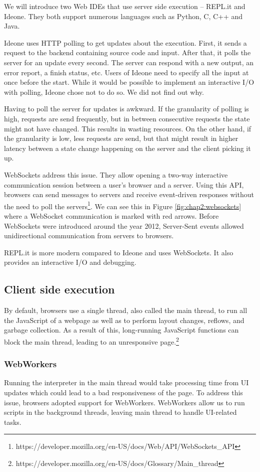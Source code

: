 We will introduce two Web IDEs that use server side execution -- REPL.it and Ideone. They both support numerous languages such
as Python, C, C++ and Java.

Ideone uses HTTP polling to get updates about the execution. First, it sends a request to the backend containing source code and input.
After that, it polls the server for an update every second. The server can respond with a new output, an error report, a finish status, etc. Users of Ideone need to
specify all the input at once before the start. While it would be possible to implement an interactive I/O with polling, Ideone chose not to do so.
We did not find out why.

Having to poll the server for updates is awkward. If the granularity of polling is high, requests are send frequently, but
in between consecutive requests the state might not have changed. This results in wasting resources. On the other hand, if the granularity is low, less
requests are send, but that might result in higher latency between a state change happening on the server and the client picking it up.

WebSockets address this issue. They allow opening a two-way interactive communication session between a user's browser and a server.
Using this API, browsers can send messages to servers and receive event-driven responses without the need to poll
the servers\footnote{https://developer.mozilla.org/en-US/docs/Web/API/WebSockets\_API}.
We can see this in Figure \ref{fig:chap2:websockets} where a WebSocket communication is marked with red arrows.
Before WebSockets were introduced around the year 2012, Server-Sent events allowed unidirectional communication from servers to browsers.

REPL.it is more modern compared to Ideone and uses WebSockets. It also provides an interactive I/O and debugging.

\subsection{Client side execution}
By default, browsers use a single thread, also called the main thread, to run all the JavaScript of a webpage as well as to perform layout
changes, reflows, and garbage collection. As a result of this, long-running JavaScript functions can block the main thread, leading to an unresponsive
page.\footnote{https://developer.mozilla.org/en-US/docs/Glossary/Main\_thread}

\subsubsection{WebWorkers}
Running the interpreter in the main thread would take processing time from UI updates which could lead to a bad responsiveness of the page. To
address this issue, browsers adopted support for WebWorkers. WebWorkers allow us to run scripts in the background threads, leaving main thread
to handle UI-related tasks.

